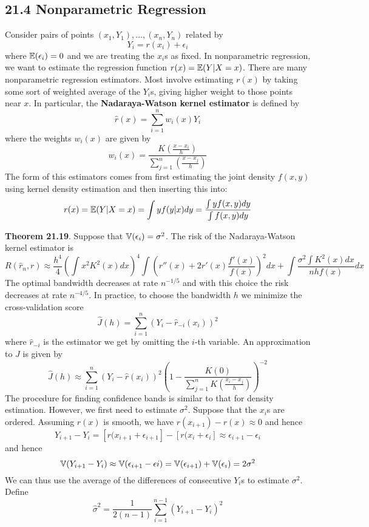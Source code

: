 \subsection*{21.4 Nonparametric Regression}\label{nonparametric-regression}
Consider pairs of points \((x_{1}, Y_{1}), \dots, (x_{n}, Y_{n})\) related by
\[
Y_{i} = r(x_{i}) + \epsilon_{i}
\]
where \(\operatorname{\mathbb{E}}(\epsilon_{i}) = 0\) and we are treating the \(x_{i}\)s as fixed. In nonparametric regression, we want to estimate the regression function \(r(x) = \operatorname{\mathbb{E}}(Y | X = x)\).
There are many nonparametric regression estimators. Most involve estimating \(r(x)\) by taking some sort of weighted average of the \(Y_{i}\)s, giving higher weight to those points near \(x\). In particular, the \textbf{Nadaraya-Watson kernel estimator} is defined by
\[
\hat{r}(x) = \sum_{i=1}^{n} w_{i}(x) Y_{i}
\]
where the weights \(w_{i}(x)\) are given by
\[
w_{i}(x) = \frac{K\left(\frac{x - x_{i}}{h}\right)}{\sum_{j=1}^{n} \left(\frac{x - x_{j}}{h}\right) }
\]
The form of this estimators comes from first estimating the joint density \(f(x, y)\) using kernel density estimation and then inserting this into:
\[
r(x) = \operatorname{\mathbb{E}}(Y | X = x) = \int y f(y | x) dy = \frac{\int y f(x, y) dy}{\int f(x, y) dy}
\]

\textbf{Theorem 21.19}. Suppose that \(\operatorname{\mathbb{V}}(\epsilon_{i}) = \sigma^{2}\). The risk of the Nadaraya-Watson kernel estimator is
\[
R(\hat{r}_{n}, r) \approx \frac{h^{4}}{4} 
\left( \int x^{2} K^{2}(x) dx\right)^{4}
\int \left( r''(x) + 2 r'(x) \frac{f'(x)}{f(x)} \right)^{2} dx
+ \int \frac{\sigma^{2} \int K^{2}(x) dx}{nh f(x)} dx
\]
The optimal bandwidth decreases at rate \(n^{-1/5}\) and with this choice the risk decreases at rate \(n^{-4/5}\).
In practice, to choose the bandwidth \(h\) we minimize the cross-validation score
\[
\hat{J}(h) = \sum_{i=1}^{n} (Y_{i} - \hat{r}_{-i}(x_{i}))^{2}
\]
where \(\hat{r}_{-i}\) is the estimator we get by omitting the \(i\)-th
variable. An approximation to \(\hat{J}\) is given by
\[
\hat{J}(h) \approx \sum_{i=1}^{n} (Y_{i} - \hat{r}(x_{i}))^{2} \left( 1 - \frac{K(0)}{\sum_{j=1}^{n} K \left( \frac{x_{i} - x_{j}}{h} \right)} \right)^{-2}
\]
The procedure for finding confidence bands is similar to that for density estimation. However, we first need to estimate \(\sigma^{2}\). Suppose that the \(x_{i}\)s are ordered. Assuming \(r(x)\) is smooth, we have \(r(x_{i+1}) - r(x) \approx 0\) and hence
\[
Y_{i+1} - Y_{i} = \left[ r(x_{i+1} + \epsilon_{i+1} \right] - \left[ r(x_{i} + \epsilon_{i} \right] \approx \epsilon_{i+1} - \epsilon_{i}
\]
and hence
\[
\operatorname{\mathbb{V}}(Y_{i+1} - Y_{i}) \approx \operatorname{\mathbb{V}}(\epsilon_{i+1} - \epsilon{i}) = \operatorname{\mathbb{V}}(\epsilon_{i+1}) + \operatorname{\mathbb{V}}(\epsilon_{i}) = 2\sigma^{2}
\]
We can thus use the average of the differences of consecutive \(Y_{i}\)s to estimate \(\sigma^{2}\). Define
\[
\hat{\sigma}^{2} = \frac{1}{2(n - 1)} \sum_{i=1}^{n-1} (Y_{i+1} - Y_{i})^{2}
\]

